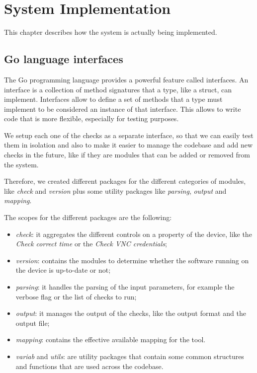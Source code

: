 \chapter{System Implementation}

This chapter describes how the system is actually being implemented.

\section{Go language interfaces}

The Go programming language provides a powerful feature called interfaces. An interface is a collection of method signatures that a type, like a struct, can implement. Interfaces allow to define a set of methods that a type must implement to be considered an instance of that interface. This allows to write code that is more flexible, especially for testing purposes.

We setup each one of the checks as a separate interface, so that we can easily test them in isolation and also to make it easier to manage the codebase and add new checks in the future, like if they are modules that can be added or removed from the system.

Therefore, we created different packages for the different categories of modules, like \textit{check} and \textit{version} plus some utility packages like \textit{parsing}, \textit{output} and \textit{mapping}.

The scopes for the different packages are the following:

\begin{itemize}
  \item \textit{check}: it aggregates the different controls on a property of the device, like the \textit{Check correct time} or the \textit{Check VNC credentials};
  \item \textit{version}: contains the modules to determine whether the software running on the device is up-to-date or not;
  \item \textit{parsing}: it handles the parsing of the input parameters, for example the verbose flag or the list of checks to run;
  \item \textit{output}: it manages the output of the checks, like the output format and the output file;
  \item \textit{mapping}: contains the effective available mapping for the tool.
  \item \textit{variab} and \textit{utils}: are utility packages that contain some common structures and functions that are used across the codebase.
\end{itemize}

